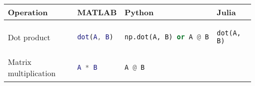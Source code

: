 \documentclass[10pt, landscape]{article}
\begin{document}
\begin{multicols}{2}
\begin{tabular}[]{@{}llll@{}}
\toprule
\begin{minipage}[b]{0.23\columnwidth}\raggedright\strut
Operation\strut
\end{minipage} & \begin{minipage}[b]{0.22\columnwidth}\raggedright\strut
MATLAB\strut
\end{minipage} & \begin{minipage}[b]{0.23\columnwidth}\raggedright\strut
Python\strut
\end{minipage} & \begin{minipage}[b]{0.20\columnwidth}\raggedright\strut
Julia\strut
\end{minipage}\tabularnewline
\midrule
\begin{minipage}[t]{0.23\columnwidth}\raggedright\strut
Dot product\strut
\end{minipage} & \begin{minipage}[t]{0.22\columnwidth}\raggedright\strut
\begin{lstlisting}[language=Matlab]
dot(A, B)
\end{lstlisting}
\strut
\end{minipage} & \begin{minipage}[t]{0.23\columnwidth}\raggedright\strut
\begin{lstlisting}[language=Python]
np.dot(A, B) or A @ B
\end{lstlisting}
\strut
\end{minipage} & \begin{minipage}[t]{0.20\columnwidth}\raggedright\strut
\begin{lstlisting}
dot(A, B)
\end{lstlisting}
\strut
\end{minipage}\tabularnewline
\begin{minipage}[t]{0.23\columnwidth}\raggedright\strut
Matrix multiplication\strut
\end{minipage} & \begin{minipage}[t]{0.22\columnwidth}\raggedright\strut
\begin{lstlisting}[language=Matlab]
A * B
\end{lstlisting}
\strut
\end{minipage} & \begin{minipage}[t]{0.23\columnwidth}\raggedright\strut
\begin{lstlisting}[language=Python]
A @ B
\end{lstlisting}
\strut
\end{minipage} & \begin{minipage}[t]{0.20\columnwidth}\raggedright\strut

\end{minipage}
\end{tabular}
\end{multicols}
\end{document}
